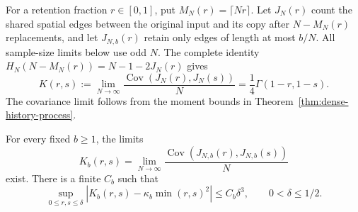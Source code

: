 \documentclass[11pt,letterpaper]{article}
\begin{document}
For a retention fraction $r\in[0,1]$, put
$M_N(r)=\lceil Nr\rceil$. Let $J_N(r)$ count the shared spatial
edges between the original input and its copy after
$N-M_N(r)$ replacements, and let $J_{N,b}(r)$ retain only edges
of length at most $b/N$. All sample-size limits below use odd $N$.
The complete identity $H_N(N-M_N(r))=N-1-2J_N(r)$ gives
\[
 K(r,s):=\lim_{N\to\infty}
       \frac{\operatorname{Cov}(J_N(r),J_N(s))}{N}
       =\frac14\Gamma(1-r,1-s).
\]
The covariance limit follows from the moment bounds in
Theorem~\ref{thm:dense-history-process}.

\begin{lemma}
\label{lem:upper-tangent-cutoff}
For every fixed $b\ge1$, the limits
\[
 K_b(r,s)=\lim_{N\to\infty}
       \frac{\operatorname{Cov}(J_{N,b}(r),J_{N,b}(s))}{N}
\]
exist. There is a finite $C_b$ such that
\begin{equation}\label{eq:upper-tangent-cutoff}
 \sup_{0\le r,s\le\delta}
 \left|K_b(r,s)-\kappa_b\min(r,s)^2\right|
                   \le C_b\delta^3,\qquad 0<\delta\le1/2.
\end{equation}
\end{lemma}
\end{document}
